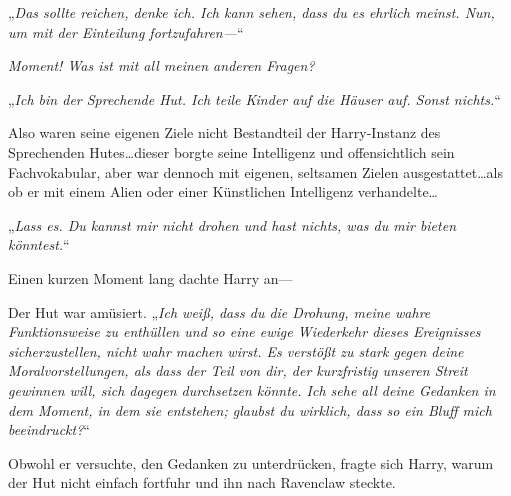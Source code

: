„\emph{Das sollte reichen, denke ich. Ich kann sehen, dass du es ehrlich meinst. Nun, um mit der Einteilung fortzufahren—}“

\emph{Moment! Was ist mit all meinen anderen Fragen?}

„\emph{Ich bin der Sprechende Hut. Ich teile Kinder auf die Häuser auf. Sonst nichts.}“

Also waren seine eigenen Ziele nicht Bestandteil der Harry-Instanz des Sprechenden Hutes…dieser borgte seine Intelligenz und offensichtlich sein Fachvokabular, aber war dennoch mit eigenen, seltsamen Zielen ausgestattet…als ob er mit einem Alien oder einer Künstlichen Intelligenz verhandelte…

„\emph{Lass es. Du kannst mir nicht drohen und hast nichts, was du mir bieten könntest.}“

Einen kurzen Moment lang dachte Harry an—

Der Hut war amüsiert. „\emph{Ich weiß, dass du die Drohung, meine wahre Funktionsweise zu enthüllen und so eine ewige Wiederkehr dieses Ereignisses sicherzustellen, nicht wahr machen wirst. Es verstößt zu stark gegen deine Moralvorstellungen, als dass der Teil von dir, der kurzfristig unseren Streit gewinnen will, sich dagegen durchsetzen könnte. Ich sehe all deine Gedanken in dem Moment, in dem sie entstehen; glaubst du wirklich, dass so ein Bluff mich beeindruckt?}“

Obwohl er versuchte, den Gedanken zu unterdrücken, fragte sich Harry, warum der Hut nicht einfach fortfuhr und ihn nach Ravenclaw steckte.

